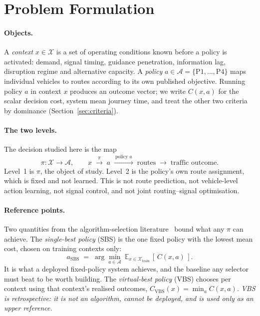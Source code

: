 \section{Problem Formulation}

\paragraph{Objects.}
A \emph{context} $x \in \mathcal{X}$ is a set of operating conditions known
before a policy is activated: demand, signal timing, guidance penetration,
information lag, disruption regime and alternative capacity. A \emph{policy}
$a \in \mathcal{A} = \{\mathrm{P1},\dots,\mathrm{P4}\}$ maps individual vehicles
to routes according to its own published objective. Running policy $a$ in
context $x$ produces an outcome vector; we write $C(x,a)$ for the scalar
decision cost, system mean journey time, and treat the other two criteria by
dominance (Section~\ref{sec:criteria}).

\paragraph{The two levels.}
The decision studied here is the map
\begin{equation}
\pi : \mathcal{X} \to \mathcal{A},
\qquad
x \;\xrightarrow{\ \pi\ }\; a \;\xrightarrow{\ \text{policy } a\ }\;
\text{routes} \;\longrightarrow\; \text{traffic outcome}.
\end{equation}
Level~1 is $\pi$, the object of study. Level~2 is the policy's own route
assignment, which is fixed and not learned. This is not route prediction, not
vehicle-level action learning, not signal control, and not joint
routing--signal optimisation.

\paragraph{Reference points.}
Two quantities from the algorithm-selection literature~\cite{bischl2016aslib}
bound what any $\pi$ can achieve. The \emph{single-best policy} (SBS) is the one
fixed policy with the lowest mean cost, chosen on training contexts only:
\begin{equation}
a_{\mathrm{SBS}} \;=\; \arg\min_{a \in \mathcal{A}}\
\mathbb{E}_{x \in \mathcal{X}_{\mathrm{train}}}\,[\,C(x,a)\,].
\end{equation}
It is what a deployed fixed-policy system achieves, and the baseline any
selector must beat to be worth building. The \emph{virtual-best policy} (VBS)
chooses per context using that context's realised outcomes,
$C_{\mathrm{VBS}}(x) = \min_{a} C(x,a)$. \emph{VBS is retrospective: it is not
an algorithm, cannot be deployed, and is used only as an upper reference.}

